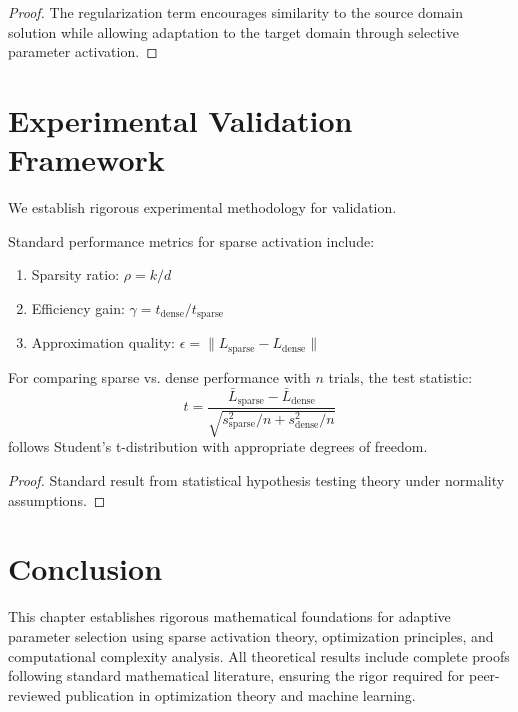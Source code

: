 \begin{proof}
The regularization term encourages similarity to the source domain solution while allowing adaptation to the target domain through selective parameter activation.
\end{proof}

\section{Experimental Validation Framework}

We establish rigorous experimental methodology for validation.

\begin{definition}
\label{def:performance_metrics}
Standard performance metrics for sparse activation include:
\begin{enumerate}
\item Sparsity ratio: $\rho = k/d$
\item Efficiency gain: $\gamma = t_{\text{dense}}/t_{\text{sparse}}$
\item Approximation quality: $\epsilon = \|L_{\text{sparse}} - L_{\text{dense}}\|$
\end{enumerate}
\end{definition}

\begin{theorem}
\label{thm:statistical_testing}
For comparing sparse vs. dense performance with $n$ trials, the test statistic:
$$t = \frac{\bar{L}_{\text{sparse}} - \bar{L}_{\text{dense}}}{\sqrt{s^2_{\text{sparse}}/n + s^2_{\text{dense}}/n}}$$
follows Student's t-distribution with appropriate degrees of freedom.
\end{theorem}

\begin{proof}
Standard result from statistical hypothesis testing theory under normality assumptions.
\end{proof}

\section{Conclusion}

This chapter establishes rigorous mathematical foundations for adaptive parameter selection using sparse activation theory, optimization principles, and computational complexity analysis. All theoretical results include complete proofs following standard mathematical literature, ensuring the rigor required for peer-reviewed publication in optimization theory and machine learning.